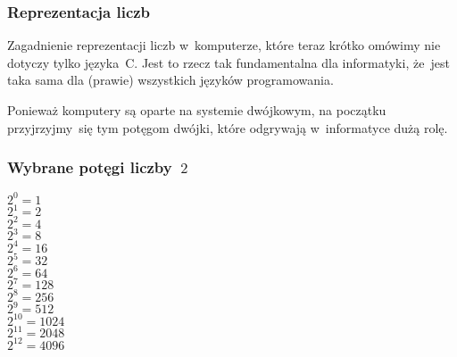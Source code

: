 \documentclass[10pt,t]{beamer}
\begin{document}
\begin{frame}
  \frametitle{Reprezentacja liczb}


  Zagadnienie reprezentacji liczb w~komputerze, które teraz krótko omówimy
  nie dotyczy tylko języka~C. Jest to rzecz tak fundamentalna dla
  informatyki, że~jest taka sama dla (prawie) wszystkich języków
  programowania.

  Ponieważ komputery są oparte na systemie dwójkowym, na początku
  przyjrzyjmy~się tym potęgom dwójki, które odgrywają w~informatyce
  dużą rolę.

\end{frame}





\begin{frame}
  \frametitle{Wybrane potęgi liczby~$2$}


  $2^{ 0 } = 1$     \\[0.1em]
  $2^{ 1 } = 2$     \\[0.1em]
  $2^{ 2 } = 4$     \\[0.1em]
  $2^{ 3 } = 8$     \\[0.1em]
  $2^{ 4 } = 16$    \\[0.1em]
  $2^{ 5 } = 32$    \\[0.1em]
  $2^{ 6 } = 64$    \\[0.1em]
  $2^{ 7 } = 128$   \\[0.1em]
  $2^{ 8 } = 256$   \\[0.1em]
  $2^{ 9 } = 512$   \\[0.1em]
  $2^{ 10 } = 1024$ \\[0.1em]
  $2^{ 11 } = 2048$ \\[0.1em]
  $2^{ 12 } = 4096$ \\[0.1em]

\end{frame}
\end{document}
